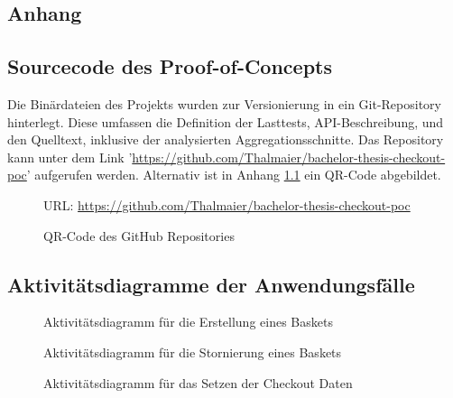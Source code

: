 \begin{anhang}

\chapter{Anhang}

\section{Sourcecode des Proof-of-Concepts}
\label{label:sourcecode}

Die Binärdateien des Projekts wurden zur Versionierung in ein Git-Repository hinterlegt. Diese umfassen die Definition der Lasttests, API-Beschreibung, und den Quelltext, inklusive der analysierten Aggregationsschnitte. Das Repository kann unter dem Link '\url{https://github.com/Thalmaier/bachelor-thesis-checkout-poc}' aufgerufen werden. Alternativ ist in Anhang \ref{fig:Github} ein QR-Code abgebildet.

\begin{figure}[h]
	\centering
	\vspace{0.8cm}
	
	\caption{QR-Code des GitHub Repositories}
	\small URL: \hspace{0.3mm} \url{https://github.com/Thalmaier/bachelor-thesis-checkout-poc}
	\label{fig:Github}
\end{figure}

\newpage

\section{Aktivitätsdiagramme der Anwendungsfälle}

\begin{figure}[h!]
	\centering
	
	\caption{Aktivitätsdiagramm für die Erstellung eines Baskets}
	\label{fig:SL-Basketcreation}
\end{figure}

\begin{figure}[h!]
	\centering
	
	\caption{Aktivitätsdiagramm für die Stornierung eines Baskets}
	\label{fig:SL-Basketstornierung}
\end{figure}

\begin{figure}[h!]
	\centering
	
	\caption{Aktivitätsdiagramm für das Setzen der Checkout Daten}
	\label{fig:SL-Checkoutdata}
\end{figure}


\end{anhang}
